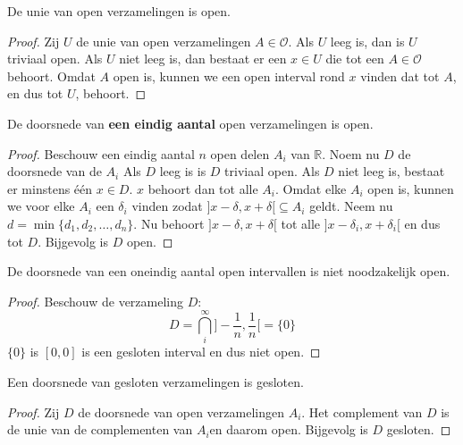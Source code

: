 \documentclass[main.tex]{subfiles}
\begin{document}
\begin{pr}
  \label{pr:unie-open-verzamelingen-open}
  De unie van open verzamelingen is open.

  \begin{proof}
    Zij $U$ de unie van open verzamelingen $A\in \mathcal{O}$.
    Als $U$ leeg is, dan is $U$ triviaal open.
    Als $U$ niet leeg is, dan bestaat er een $x\in U$ die tot een $A \in \mathcal{O}$ behoort.
    Omdat $A$ open is, kunnen we een open interval rond $x$ vinden dat tot $A$, en dus tot $U$, behoort.
  \end{proof}
\end{pr}

\begin{pr}
  \label{pr:eindige-doorsnede-open-verzamelingen-open}
  De doorsnede van \textbf{een eindig aantal} open verzamelingen is open.

  \begin{proof}
    Beschouw een eindig aantal $n$ open delen $A_{i}$ van $\mathbb{R}$.
    Noem nu $D$ de doorsnede van de $A_{i}$
    Als $D$ leeg is is $D$ triviaal open.
    Als $D$ niet leeg is, bestaat er minstens \'e\'en $x\in D$.
    $x$ behoort dan tot alle $A_{i}$.
    Omdat elke $A_{i}$ open is, kunnen we voor elke $A_{i}$ een $\delta_{i}$ vinden zodat $]x-\delta,x+\delta[ \subseteq A_{i}$ geldt.
    Neem nu $d = \min\{ d_{1}, d_{2},\dotsc, d_{n}\}$.
    Nu behoort $]x-\delta,x+\delta[$ tot alle $]x-\delta_{i},x+\delta_{i}[$ en dus tot $D$.
    Bijgevolg is $D$ open.
  \end{proof}
\end{pr}

\begin{tvb}
  De doorsnede van een oneindig aantal open intervallen is niet noodzakelijk open.

  \begin{proof}
    Beschouw de verzameling $D$:
    \[ D = \bigcap_{i}^{\infty}]-\frac{1}{n},\frac{1}{n}[ = \{ 0 \} \]
    $\{ 0 \}$ is $[0,0]$ is een gesloten interval en dus niet open.\needed
  \end{proof}
\end{tvb}

\begin{pr}
  Een doorsnede van gesloten verzamelingen is gesloten.

  \begin{proof}
    Zij $D$ de doorsnede van open verzamelingen $A_{i}$.
    Het complement van $D$ is de unie van de complementen van $A_{i}$\needed en daarom open.
    Bijgevolg is $D$ gesloten.
  \end{proof}
\end{pr}
\end{document}
